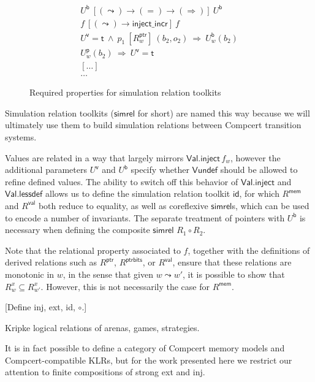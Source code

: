 \documentclass[acmsmall,anonymous]{acmart}
\newcommand{\kw}[1]{\ensuremath{ \textsf{#1} }}
\newcommand{\ifr}[1]{\ [{#1}]\ }
\begin{document}
\begin{figure}
  \begin{gather*}
    U^\kw{b} \ifr{(\leadsto) \rightarrow (=) \rightarrow (\Rightarrow)} U^\kw{b} \\
    f \ifr{(\leadsto) \rightarrow \kw{inject\_incr}} f \\
    U^\kw{v} = \kw{t} \ \wedge\  p_1 \ifr{R^\kw{ptr}_w} (b_2, o_2) \ \Rightarrow\  U^\kw{b}_w(b_2) \\
    U^\kw{p}_w(b_2) \ \Rightarrow\  U^\kw{v} = \kw{t} \\
    [\ldots] \\
    \ldots
  \end{gather*}
  \caption{Required properties for simulation relation toolkits}
  \label{fig:simrelprop}
\end{figure}

Simulation relation toolkits (\kw{simrel} for short)
are named this way because we will ultimately
use them to build simulation relations between
Compcert transition systems.

Values are related in a way that largely mirrors $\kw{Val.inject}\,f_w$,
however the additional parameters $U^\kw{v}$ and $U^\kw{b}$
specify whether $\kw{Vundef}$ should be allowed to refine defined values.
The ability to switch off this behavior of \kw{Val.inject} and \kw{Val.lessdef}
allows us to define the simulation relation toolkit \kw{id},
for which $R^\kw{mem}$ and $R^\kw{val}$ both reduce to equality,
as well as coreflexive \kw{simrel}s,
which can be used to encode a number of invariants.
The separate treatment of pointers with $U^\kw{b}$
is necessary when defining the composite \kw{simrel} $R_1 \circ R_2$.

Note that the relational property associated to $f$,
together with the definitions of
derived relations such as $R^\kw{ptr}$, $R^\kw{ptrbits}$, or $R^\kw{val}$,
ensure that these relations are monotonic in $w$,
in the sense that given $w \leadsto w'$,
it is possible to show that $R^x_w \subseteq R^x_{w'}$.
However,
this is not necessarily the case for $R^\kw{mem}$.



[Define inj, ext, id, $\circ$.]


Kripke logical relations of arenas, games, strategies.

It is in fact possible to define a
category of Compcert memory models and Compcert-compatible KLRs,
but for the work presented here we restrict our attention
to finite compositions of strong \textsf{ext} and \textsf{inj}.
\end{document}
